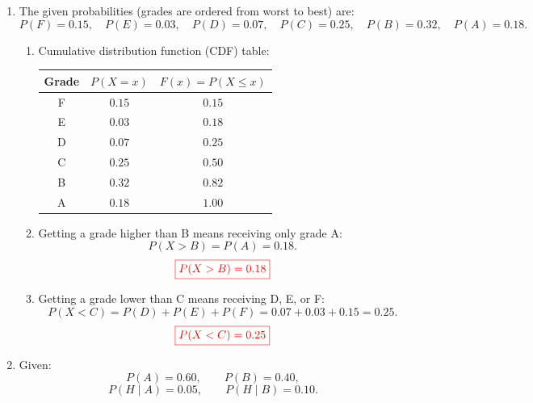\documentclass[12pt,a4paper]{article}
\begin{document}
\begin{enumerate}
\begin{enumerate}
\item Expected total gain for $10$ games:
\[
10\cdot E(X)=10\cdot\frac{1}{3}=\frac{10}{3}\ \text{TL}.
\]
When the entry fee ($30$~TL) is subtracted, the net expected value is:
\[
\frac{10}{3}-30=\frac{10-90}{3}=-\frac{80}{3}\ \text{TL}\approx -26.67\ \text{TL}.
\]
\[
{\color{red}\boxed{\text{Net expected gain}=-\frac{80}{3}\ \text{TL}\approx -26.67\ \text{TL}}}
\]
\end{enumerate}

\item The given probabilities (grades are ordered from worst to best) are:
\[
P(F)=0.15,\quad
P(E)=0.03,\quad
P(D)=0.07,\quad
P(C)=0.25,\quad
P(B)=0.32,\quad
P(A)=0.18.
\]

\begin{enumerate}
\item Cumulative distribution function (CDF) table:

\begin{center}
\begin{tabular}{ccc}
\toprule
\textbf{Grade} & $P(X=x)$ & $F(x)=P(X\le x)$\\
\midrule
F & $0.15$ & $0.15$\\
E & $0.03$ & $0.18$\\
D & $0.07$ & $0.25$\\
C & $0.25$ & $0.50$\\
B & $0.32$ & $0.82$\\
A & $0.18$ & $1.00$\\
\bottomrule
\end{tabular}
\end{center}

\item Getting a grade higher than B means receiving only grade A:
\[
P(X>B)=P(A)=0.18.
\]
\[
{\color{red}\boxed{P(X>B)=0.18}}
\]

\item Getting a grade lower than C means receiving D, E, or F:
\[
P(X<C)=P(D)+P(E)+P(F)=0.07+0.03+0.15=0.25.
\]
\[
{\color{red}\boxed{P(X<C)=0.25}}
\]
\end{enumerate}

\item Given:
\[
P(A)=0.60,\qquad P(B)=0.40,
\]
\[
P(H\mid A)=0.05,\qquad P(H\mid B)=0.10.
\]


\end{enumerate}
\end{document}
